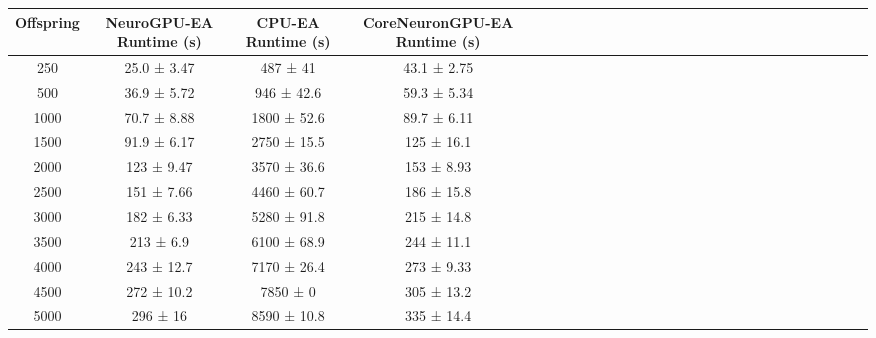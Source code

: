 \begin{tabular}{|c|c|c|c|c|c|c|c|c|c|c|c|c|c|c|c|c|c|c|c|c|c|c|c|c|c|c|c|}
\toprule
 Offspring & NeuroGPU-EA Runtime (s) & CPU-EA Runtime (s) & CoreNeuronGPU-EA Runtime (s) \\
\midrule
       250 &             25.0 ± 3.47 &           487 ± 41 &                  43.1 ± 2.75 \\
       500 &             36.9 ± 5.72 &         946 ± 42.6 &                  59.3 ± 5.34 \\
      1000 &             70.7 ± 8.88 &        1800 ± 52.6 &                  89.7 ± 6.11 \\
      1500 &             91.9 ± 6.17 &        2750 ± 15.5 &                   125 ± 16.1 \\
      2000 &              123 ± 9.47 &        3570 ± 36.6 &                   153 ± 8.93 \\
      2500 &              151 ± 7.66 &        4460 ± 60.7 &                   186 ± 15.8 \\
      3000 &              182 ± 6.33 &        5280 ± 91.8 &                   215 ± 14.8 \\
      3500 &               213 ± 6.9 &        6100 ± 68.9 &                   244 ± 11.1 \\
      4000 &              243 ± 12.7 &        7170 ± 26.4 &                   273 ± 9.33 \\
      4500 &              272 ± 10.2 &           7850 ± 0 &                   305 ± 13.2 \\
      5000 &                296 ± 16 &        8590 ± 10.8 &                   335 ± 14.4 \\
\bottomrule
\end{tabular}
